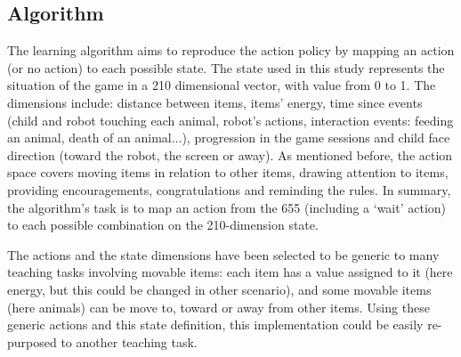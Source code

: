 \subsection{Algorithm}

The learning algorithm aims to reproduce the action policy by mapping an action (or no action) to each possible state. The state used in this study represents the situation of the game in a 210 dimensional vector, with value from 0 to 1. The dimensions include: distance between items, items' energy, time since events (child and robot touching each animal, robot's actions, interaction events: feeding an animal, death of an animal...), progression in the game sessions and child face direction (toward the robot, the screen or away). As mentioned before, the action space covers moving items in relation to other items, drawing attention to items, providing encouragements, congratulations and reminding the rules. In summary, the algorithm's task is to map an action from the 655 (including a `wait' action) to each possible combination on the 210-dimension state.

The actions and the state dimensions have been selected to be generic to many teaching tasks involving movable items: each item has a value assigned to it (here energy, but this could be changed in other scenario), and some movable items (here animals) can be move to, toward or away from other items. Using these generic actions and this state definition, this implementation could be easily re-purposed to another teaching task.

